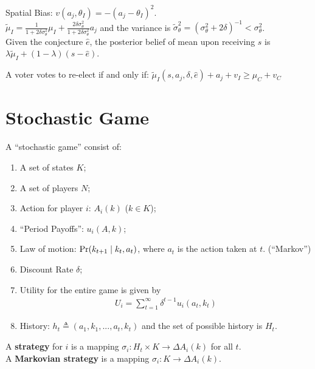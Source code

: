 \documentclass[11pt]{elegantbook}
\begin{document}
\begin{example}
    Spatial Bias: $v(a_j,\theta_I)=-(a_j-\theta_I)^2$.\\
    $\tilde{\mu}_I=\frac{1}{1+2\delta \sigma_\theta^2}\mu_I+\frac{2\delta\sigma_\theta^2}{1+2\delta\sigma_\theta^2}a_j$ and the variance is $\tilde{\sigma}_\theta^2=\left(\sigma_\theta^2+2\delta\right)^{-1}<\sigma_\theta^2$.\\
    Given the conjecture $\hat{e}$, the posterior belief of mean upon receiving $s$ is $\lambda \tilde{\mu}_I+(1-\lambda)(s-\hat{e})$.
\end{example}

A voter votes to re-elect if and only if: $\tilde{\mu}_I(s,a_j,\delta,\hat{e})+a_j+v_I\geq \mu_C+v_C$


\section{Stochastic Game}
A ``stochastic game'' consist of:
\begin{enumerate}
    \item A set of states $K$;
    \item A set of players $N$;
    \item Action for player $i$: $A_i(k)$ ($k\in K$);
    \item ``Period Payoffs'': $u_i(A,k)$;
    \item Law of motion: $\textnormal{Pr}(k_{t+1}\mid k_t,a_t)$, where $a_t$ is the action taken at $t$. (``Markov'')
    \item Discount Rate $\delta$;
    \item Utility for the entire game is given by
    \begin{equation}
        \begin{aligned}
            U_i=\sum_{t=1}^\infty \delta^{t-1}u_i(a_t,k_t)
        \end{aligned}
        \nonumber
    \end{equation}
    \item History: $h_t\triangleq (a_1,k_1,...,a_t,k_t)$ and the set of possible history is $H_t$.
\end{enumerate}
\begin{definition}
    \normalfont
    A \textbf{strategy} for $i$ is a mapping $\sigma_i: H_t\times K \rightarrow \Delta A_i(k)$ for all $t$.\\
    A \textbf{Markovian strategy} is a mapping $\sigma_i: K \rightarrow \Delta A_i(k)$.
\end{definition}
\end{document}
